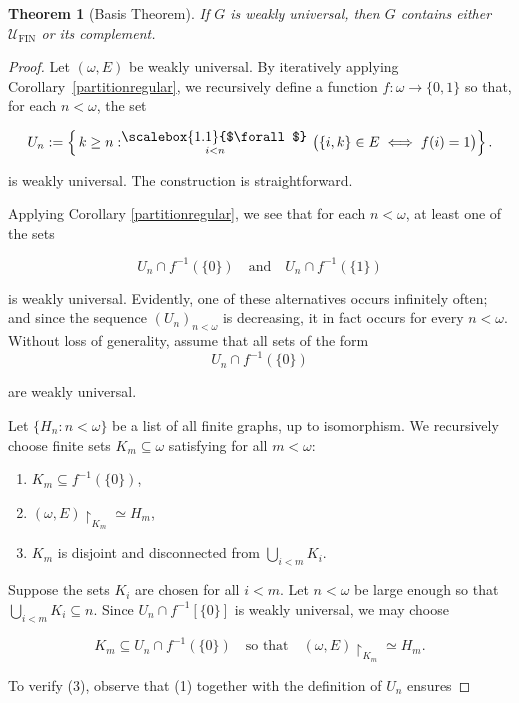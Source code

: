 \documentclass{amsart}
\newtheorem{theorem}{Theorem}[section]
\theoremstyle{plain}
\theoremstyle{definition}
\theoremstyle{remark}
\numberwithin{equation}{section}
\newcommand{\UU}{\mathcal{U}}
\DeclareMathOperator{\fin}{FIN}
\begin{document}
\begin{theorem}[Basis Theorem]\label{t:BasisThm} If $G$ is weakly universal, then $G$ contains either $\UU_{\fin}$ or its complement. \end{theorem}
\begin{proof}
Let \((\omega, E)\) be weakly universal.  
By iteratively applying Corollary~\ref{partitionregular}, we recursively define a function
\(f\colon \omega \longrightarrow \{0,1\}\) so that, for each \(n<\omega\), the set


    \[
U_n := 
\left\{\,k\ge n :
  \mathrel{\vcenter{\hbox{%
    $\displaystyle
      \mathop{\scalebox{1.1}{$\forall$}}_{\,\scriptstyle i<n}$
  }}}%
  \!\!\!\;\bigl(\{i,k\}\in E \iff f(i)=1\bigr)
\right\}.
\]

is weakly universal.  
The construction is straightforward.

Applying Corollary \ref{partitionregular}, we see that for each $n<\omega$, at least one of the sets


\[
U_{n}\cap f^{-1}(\{0\})
\quad\text{and}\quad
U_{n}\cap f^{-1}(\{1\})
\]


is weakly universal.  
Evidently, one of these alternatives occurs infinitely often; and since the sequence \((U_{n})_{n<\omega}\) is decreasing, it in fact occurs for every \(n<\omega\).  
Without loss of generality, assume that all sets of the form
\[
U_{n}\cap f^{-1}(\{0\})
\]

are weakly universal.

Let \(\{H_{n} : n<\omega\}\) be a list of all finite graphs, up to isomorphism.  
We recursively choose finite sets \(K_{m}\subseteq \omega\) satisfying for all \(m<\omega\):
\begin{enumerate}
  \item \(K_{m}\subseteq f^{-1}(\{0\})\),
  \item \((\omega, E)\restriction_{K_{m}} \simeq H_{m}\),
  \item $K_m$ is disjoint and disconnected from $\bigcup\limits_{i<m}K_i.$
\end{enumerate}

Suppose the sets \(K_{i}\) are chosen for all \(i<m\).  
Let \(n<\omega\) be large enough so that \(\bigcup_{i<m} K_{i} \subseteq n\).  
Since \(U_{n}\cap f^{-1}[\{0\}]\) is weakly universal, we may choose


\[
K_{m} \subseteq U_{n}\cap f^{-1}(\{0\})
\quad\text{so that}\quad
(\omega, E)\restriction_{K_{m}} \simeq H_{m}.
\]


To verify (3), observe that (1) together with the definition of \(U_{n}\) ensures



\end{proof}
\end{document}
